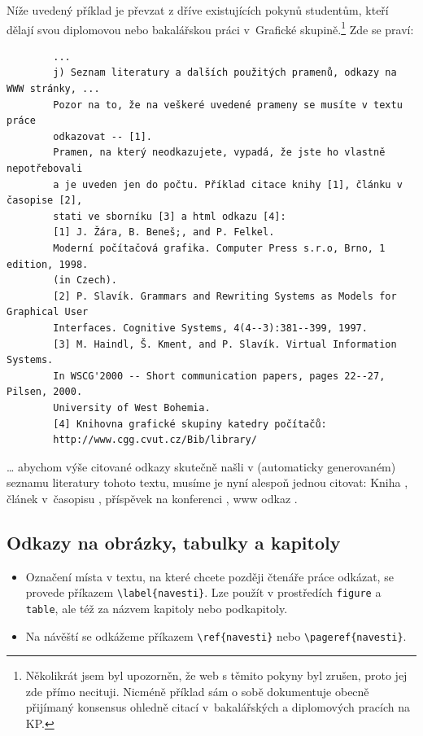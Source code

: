 \documentclass[11pt,twoside,a4paper]{book}
\begin{document}
	
	Níže uvedený příklad je převzat z dříve existujících pokynů studentům, kteří 
	dělají svou diplomovou nebo bakalářskou práci v~Grafické skupině.\footnote{Několikrát 
		jsem byl upozorněn, že web s těmito pokyny byl zrušen, proto jej zde přímo necituji. 
		Nicméně příklad sám o sobě dokumentuje obecně přijímaný konsensus ohledně citací 
		v~bakalářských a diplomových pracích na KP.} Zde se praví:
	\begin{small}
		\begin{verbatim}
		...
		j) Seznam literatury a dalších použitých pramenů, odkazy na WWW stránky, ...
		Pozor na to, že na veškeré uvedené prameny se musíte v textu práce 
		odkazovat -- [1]. 
		Pramen, na který neodkazujete, vypadá, že jste ho vlastně nepotřebovali 
		a je uveden jen do počtu. Příklad citace knihy [1], článku v časopise [2], 
		stati ve sborníku [3] a html odkazu [4]: 
		[1] J. Žára, B. Beneš;, and P. Felkel. 
		Moderní počítačová grafika. Computer Press s.r.o, Brno, 1 edition, 1998. 
		(in Czech). 
		[2] P. Slavík. Grammars and Rewriting Systems as Models for Graphical User 
		Interfaces. Cognitive Systems, 4(4--3):381--399, 1997. 
		[3] M. Haindl, Š. Kment, and P. Slavík. Virtual Information Systems. 
		In WSCG'2000 -- Short communication papers, pages 22--27, Pilsen, 2000. 
		University of West Bohemia. 
		[4] Knihovna grafické skupiny katedry počítačů: 
		http://www.cgg.cvut.cz/Bib/library/ 
		\end{verbatim}
	\end{small}
	\ldots{} abychom výše citované odkazy skutečně našli v (automaticky generovaném) seznamu literatury tohoto textu, musíme je nyní alespoň jednou citovat: Kniha \cite{kniha}, článek v~časopisu \cite{clanek}, příspěvek na konferenci \cite{sbornik}, www odkaz \cite{www}.
	
	\subsection{Odkazy na obrázky, tabulky a kapitoly}
	\begin{itemize}
		\item Označení místa v textu, na které chcete později čtenáře práce odkázat, se provede příkazem \verb|\label{navesti}|. Lze použít v prostředích \verb|figure| a  \verb|table|, ale též za názvem kapitoly nebo podkapitoly.
		\item Na návěští se odkážeme příkazem \verb|\ref{navesti}| nebo \verb|\pageref{navesti}|.
	\end{itemize}
	
\end{document}
